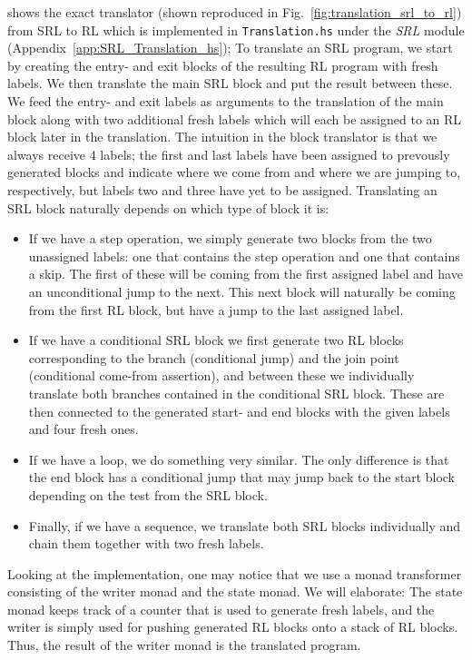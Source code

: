\cite[Fig.~21]{REV} shows the exact translator (shown reproduced in Fig.~\ref{fig:translation_srl_to_rl}) from SRL to RL which is implemented in \texttt{Translation.hs} under the \textit{SRL} module (Appendix~\ref{app:SRL_Translation_hs}); To translate an SRL program, we start by creating the entry- and exit blocks of the resulting RL program with fresh labels. We then translate the main SRL block and put the result between these. We feed the entry- and exit labels as arguments to the translation of the main block along with two additional fresh labels which will each be assigned to an RL block later in the translation. The intuition in the block translator is that we always receive 4 labels; the first and last labels have been assigned to prevously generated blocks and indicate where we come from and where we are jumping to, respectively, but labels two and three have yet to be assigned. Translating an SRL block naturally depends on which type of block it is:
\begin{itemize}
  \item If we have a step operation, we simply generate two blocks from the two unassigned labels: one that contains the step operation and one that contains a skip. The first of these will be coming from the first assigned label and have an unconditional jump to the next. This next block will naturally be coming from the first RL block, but have a jump to the last assigned label.
  \item If we have a conditional SRL block we first generate two RL blocks corresponding to the branch (conditional jump) and the join point (conditional come-from assertion), and between these we individually translate both branches contained in the conditional SRL block. These are then connected to the generated start- and end blocks with the given labels and four fresh ones.
  \item If we have a loop, we do something very similar. The only difference is that the end block has a conditional jump that may jump back to the start block depending on the test from the SRL block.
  \item Finally, if we have a sequence, we translate both SRL blocks individually and chain them together with two fresh labels.
\end{itemize}
Looking at the implementation, one may notice that we use a monad transformer consisting of the writer monad and the state monad. We will elaborate: The state monad keeps track of a counter that is used to generate fresh labels, and the writer is simply used for pushing generated RL blocks onto a stack of RL blocks. Thus, the result of the writer monad is the translated program.
